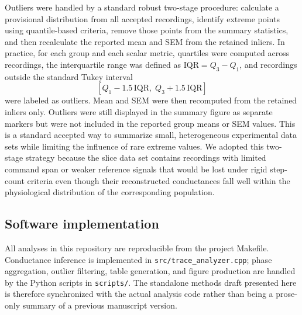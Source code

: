 \documentclass[11pt]{article}
\begin{document}
Outliers were handled by a standard robust two-stage procedure: calculate a provisional distribution from all accepted recordings, identify extreme points using quantile-based criteria, remove those points from the summary statistics, and then recalculate the reported mean and SEM from the retained inliers. In practice, for each group and each scalar metric, quartiles were computed across recordings, the interquartile range was defined as $\mathrm{IQR}=Q_3-Q_1$, and recordings outside the standard Tukey interval
\begin{equation}
\left[Q_1 - 1.5\,\mathrm{IQR},\; Q_3 + 1.5\,\mathrm{IQR}\right]
\end{equation}
were labeled as outliers. Mean and SEM were then recomputed from the retained inliers only. Outliers were still displayed in the summary figure as separate markers but were not included in the reported group means or SEM values. This is a standard accepted way to summarize small, heterogeneous experimental data sets while limiting the influence of rare extreme values. We adopted this two-stage strategy because the slice data set contains recordings with limited command span or weaker reference signals that would be lost under rigid step-count criteria even though their reconstructed conductances fall well within the physiological distribution of the corresponding population.

\subsection{Software implementation}
All analyses in this repository are reproducible from the project Makefile. Conductance inference is implemented in \texttt{src/trace\_analyzer.cpp}; phase aggregation, outlier filtering, table generation, and figure production are handled by the Python scripts in \texttt{scripts/}. The standalone methods draft presented here is therefore synchronized with the actual analysis code rather than being a prose-only summary of a previous manuscript version.


\end{document}
